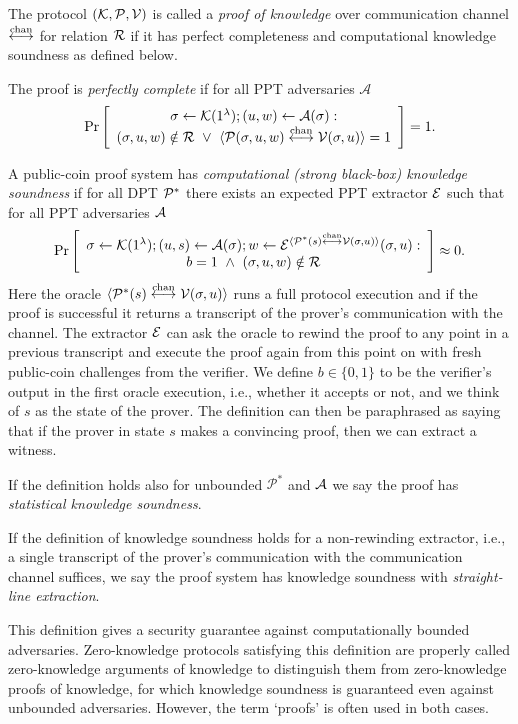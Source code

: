 The protocol $(\mathcal{K},\mathcal{P},\mathcal{V})$ is called a \emph{proof of knowledge} over communication channel $\overset{\textnormal{chan}}{\longleftrightarrow}$ for relation $\mathcal{R}$ if it has perfect completeness and computational knowledge soundness as defined below.

\begin{definition}
The proof is \emph{perfectly complete} if for all PPT adversaries $\mathcal{A}$
$$\Pr \left[ \begin{array}{c} \mathsf{\sigma}\gets \mathcal{K}(1^{\lambda}); (u,w) \leftarrow \mathcal{A}(\mathsf{\sigma}): \\
(\mathsf{\sigma},u,w)\notin \mathcal{R} ~\vee~ \langle \mathcal{P}(\mathsf{\sigma},u,w)\overset{\textnormal{chan}}{\longleftrightarrow}\mathcal{V}(\mathsf{\sigma},u)\rangle=1 \end{array}\right] =1.$$
\end{definition}

\begin{definition}
A public-coin proof system has \emph{computational (strong black-box) knowledge soundness} if for all DPT $\mathcal{P}^*$ there exists an expected PPT extractor $\mathcal{E}$ such that for all PPT adversaries $\mathcal{A}$
$$\Pr\left[\begin{array}{c} \mathsf{\sigma}\gets \mathcal{K}(1^{\lambda});(u,s) \gets \mathcal{A}(\mathsf{\sigma}); w\gets \mathcal{E}^{\langle \mathcal{P}^*(s)\overset{\textnormal{chan}}{\longleftrightarrow}\mathcal{V}(\mathsf{\sigma},u)\rangle}(\mathsf{\sigma},u):\\ b=1 ~\wedge~ (\mathsf{\sigma},u,w)\notin \mathcal{R} \end{array}\right]\approx 0.$$ 
Here the oracle $\langle \mathcal{P}^*(s)\overset{\textnormal{chan}}{\longleftrightarrow}\mathcal{V}(\mathsf{\sigma},u)\rangle$ runs a full protocol execution and if the proof is successful it returns a transcript of the prover's communication with the channel. The extractor $\mathcal{E}$ can ask the oracle to rewind the proof to any point in a previous transcript and execute the proof again from this point on with fresh public-coin challenges from the verifier. We define $b\in \{0,1\}$ to be the verifier's output in the first oracle execution, i.e., whether it accepts or not, and we think of $s$ as the state of the prover. The definition can then be paraphrased as saying that if the prover in state $s$ makes a convincing proof, then we can extract a witness.

If the definition holds also for unbounded $\mathcal{P}^*$ and $\mathcal{A}$ we say the proof has {\em statistical knowledge soundness}. 

If the definition of knowledge soundness holds for a non-rewinding extractor, i.e., a single transcript of the prover's communication with the communication channel suffices, we say the proof system has knowledge soundness with {\em straight-line extraction}. 
\end{definition}
\noindent
This definition gives a security guarantee against computationally bounded adversaries. Zero-knowledge protocols satisfying this definition are properly called zero-knowledge arguments of knowledge to distinguish them from zero-knowledge proofs of knowledge, for which knowledge soundness is guaranteed even against unbounded adversaries. However, the term `proofs' is often used in both cases.

